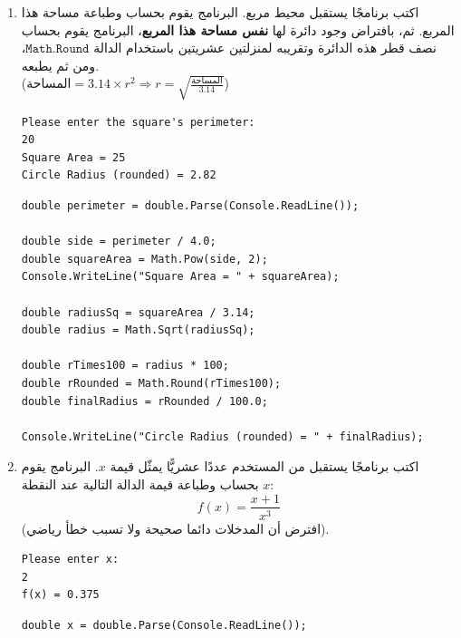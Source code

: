 \documentclass[14pt]{extarticle}
\begin{document}
\begin{enumerate}[itemsep=3em]
    \item
    اكتب برنامجًا يستقبل محيط مربع.
    البرنامج يقوم بحساب وطباعة مساحة هذا المربع.
    ثم، بافتراض وجود دائرة لها \textbf{نفس مساحة هذا المربع}، البرنامج يقوم بحساب نصف قطر هذه الدائرة وتقريبه لمنزلتين عشريتين باستخدام الدالة $\mathtt{Math.Round}$، ومن ثم يطبعه. \\
    ($\text{المساحة} = 3.14 \times r^2 \Rightarrow r = \sqrt{\frac{\text{المساحة}}{3.14}}$)
    \ifdetailed
    \begin{boxExample}
    \begin{english}
    \begin{verbatim}
Please enter the square's perimeter:
20
Square Area = 25
Circle Radius (rounded) = 2.82
    \end{verbatim}
    \end{english}
    \end{boxExample}
    \ifwithsols
    \begin{boxSolution}
    \begin{english}
    \begin{verbatim}
double perimeter = double.Parse(Console.ReadLine());

double side = perimeter / 4.0;
double squareArea = Math.Pow(side, 2);
Console.WriteLine("Square Area = " + squareArea);

double radiusSq = squareArea / 3.14;
double radius = Math.Sqrt(radiusSq);

double rTimes100 = radius * 100;
double rRounded = Math.Round(rTimes100);
double finalRadius = rRounded / 100.0;

Console.WriteLine("Circle Radius (rounded) = " + finalRadius);
    \end{verbatim}
    \end{english}
    \end{boxSolution}
    \fi
    \fi
    \clearpage

    \item
    اكتب برنامجًا يستقبل من المستخدم عددًا عشريًّا يمثّل قيمة $x$.
    البرنامج يقوم بحساب وطباعة قيمة الدالة التالية عند النقطة $x$:
    $$ f(x) = \frac{x + 1}{x^3} $$
    (افترض أن المدخلات دائما صحيحة ولا تسبب خطأ رياضي).
    \ifdetailed
    \begin{boxExample}
    \begin{english}
    \begin{verbatim}
Please enter x:
2
f(x) = 0.375
    \end{verbatim}
    \end{english}
    \end{boxExample}
    \ifwithsols
    \begin{boxSolution}
    \begin{english}
    \begin{verbatim}
double x = double.Parse(Console.ReadLine());


\end{verbatim}
\end{english}
\end{boxSolution}
\end{enumerate}
\end{document}
